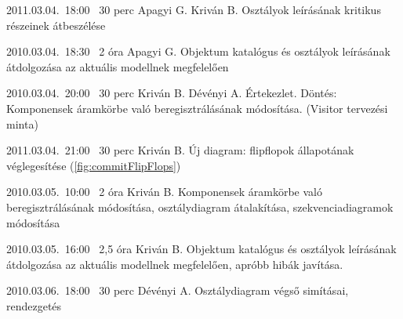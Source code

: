 \begin{naplo}
\bejegyzes
{2011.03.04.~18:00~} %
{30 perc} %
{Apagyi G.\newline
Kriván B.} %
{Osztályok leírásának kritikus részeinek átbeszélése} %

\bejegyzes
{2010.03.04.~18:30~}
{2 óra}
{Apagyi G.}
{Objektum katalógus és osztályok leírásának átdolgozása az aktuális modellnek megfelelően}

\bejegyzes
{2010.03.04.~20:00~}
{30 perc}
{Kriván B.\newline
Dévényi A.}
{Értekezlet.\newline
Döntés: Komponensek áramkörbe való beregisztrálásának módosítása. (Visitor tervezési minta)}

\bejegyzes
{2011.03.04.~21:00~} %
{30 perc} %
{Kriván B.} %
{Új diagram: flipflopok állapotának véglegesítése (\ref{fig:commitFlipFlops})} %

\bejegyzes
{2010.03.05.~10:00~}
{2 óra}
{Kriván B.}
{Komponensek áramkörbe való beregisztrálásának módosítása, osztálydiagram átalakítása, szekvenciadiagramok módosítása}

\bejegyzes
{2010.03.05.~16:00~}
{2,5 óra}
{Kriván B.}
{Objektum katalógus és osztályok leírásának átdolgozása az aktuális modellnek megfelelően, apróbb hibák javítása.}

\bejegyzes
{2010.03.06.~18:00~}
{30 perc}
{Dévényi A.}
{Osztálydiagram végső simításai, rendezgetés}

\end{naplo}
